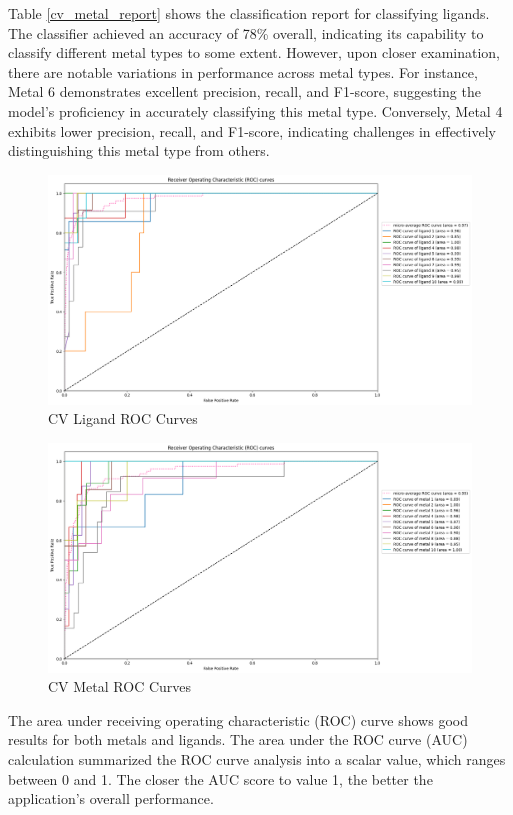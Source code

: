 Table \ref{cv_metal_report} shows the classification report for classifying ligands. The classifier achieved an accuracy of 78\% overall, indicating its capability to classify different metal types to some extent. However, upon closer examination, there are notable variations in performance across metal types. For instance, Metal 6 demonstrates excellent precision, recall, and F1-score, suggesting the model's proficiency in accurately classifying this metal type. Conversely, Metal 4 exhibits lower precision, recall, and F1-score, indicating challenges in effectively distinguishing this metal type from others.
\begin{figure}[h!]
  \centering
    \includegraphics[width=1.0\textwidth]{figures/ligand_roc.png}
    \caption{CV Ligand ROC Curves}
    \label{ligand_roc}
\end{figure}
\begin{figure}[h!]
  \centering
    \includegraphics[width=1.0\textwidth]{figures/metal_roc.png}
    \caption{CV Metal ROC Curves}
    \label{metal_roc}
\end{figure}
The area under receiving operating characteristic (ROC) curve shows good results for both metals and ligands. The area under the ROC curve (AUC) calculation summarized the ROC curve analysis into a scalar value, which ranges between 0 and 1. The closer the AUC score to value 1, the better the application’s overall performance.
